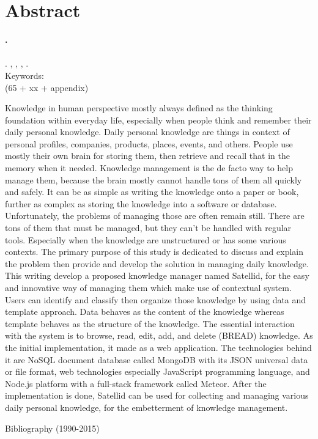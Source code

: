 
\begingroup
\let\clearpage\relax
\let\cleardoublepage\relax

\label{chap:abstract}
\chapter{Abstract}

\textbf{\myName.} \myNPM \\
\textbf{\myTitle} \\
\textbf{\myThesisType}. \myDepartmentLong, \myFacultyLong, \myUni, \myYear. \\
Keywords: \myKeywords \\
(65 + xx + appendix)

\hfill

\singlespacing

Knowledge in human perspective mostly always defined as the thinking foundation within everyday life,
especially when people think and remember their daily personal knowledge.
Daily personal knowledge are things in context of personal profiles, companies, products, places, events, and others.
People use mostly their own brain for storing them, then retrieve and recall that in the memory when it needed.
Knowledge management is the de facto way to help manage them, because the brain mostly cannot handle tons of them all quickly and safely.
It can be as simple as writing the knowledge onto a paper or book, further as complex as storing the knowledge into a software or database.
Unfortunately, the problems of managing those are often remain still.
There are tons of them that must be managed, but they can’t be handled with regular tools.
Especially when the knowledge are unstructured or has some various contexts.
The primary purpose of this study is dedicated to discuss and explain the problem then provide and develop the solution in managing daily knowledge.
This writing develop a proposed knowledge manager named Satellid, for the easy and innovative way of managing them which make use of contextual system.
Users can identify and classify then organize those knowledge by using data and template approach.
Data behaves as the content of the knowledge whereas template behaves as the structure of the knowledge.
The essential interaction with the system is to browse, read, edit, add, and delete (BREAD) knowledge.
As the initial implementation, it made as a web application.
The technologies behind it are NoSQL document database called MongoDB with its JSON universal data or file format, web technologies especially JavaScript programming language, and Node.js platform with a full-stack framework called Meteor.
After the implementation is done, Satellid can be used for collecting and managing various daily personal knowledge, for the embetterment of knowledge management.

\onehalfspacing

\hfill


\noindent Bibliography (1990-2015)



\endgroup

\vfill
